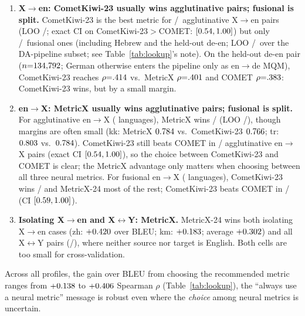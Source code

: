\documentclass[11pt]{article}
\begin{document}
\begin{enumerate}[leftmargin=*,itemsep=4pt,topsep=4pt]
  \item \textbf{X$\to$en: CometKiwi-23 usually wins agglutinative pairs; fusional is split.} CometKiwi-23 is the best metric for \WinXtoEnAgglutin/\WinTotalXtoEnAgglutin\ agglutinative X$\to$en pairs (LOO \LOOXtoEnAgglutin/\LOOTotalXtoEnAgglutin; exact CI on CometKiwi-23$>$COMET: $[0.54, 1.00]$) but only \WinXtoEnFusional/\WinTotalXtoEnFusional\ fusional ones (including Hebrew and the held-out de-en; LOO \LOOXtoEnFusional/\LOOTotalXtoEnFusional\ over the DA-pipeline subset; see Table~\ref{tab:lookup}'s note). On the held-out de-en pair ($n{=}134{,}792$; German otherwise enters the pipeline only as en$\to$de MQM), CometKiwi-23 reaches $\rho{=}.414$ vs.\ MetricX $\rho{=}.401$ and COMET $\rho{=}.383$: CometKiwi-23 wins, but by a small margin.

  \item \textbf{en$\to$X: MetricX usually wins agglutinative pairs; fusional is split.} For agglutinative en$\to$X (\WinTotalEntoXAgglutin{} languages), MetricX wins \WinEntoXAgglutin/\WinTotalEntoXAgglutin{} (LOO \LOOEntoXAgglutin/\LOOTotalEntoXAgglutin), though margins are often small (kk: MetricX $0.784$ vs.\ CometKiwi-23 $0.766$; tr: $0.803$ vs.\ $0.784$). CometKiwi-23 still beats COMET in \BeatsCometEntoXAgglutin/\WinTotalEntoXAgglutin{} agglutinative en$\to$X pairs (exact CI $[0.54, 1.00]$), so the choice between CometKiwi-23 and COMET is clear; the MetricX advantage only matters when choosing between all three neural metrics. For fusional en$\to$X (\WinTotalEntoXFusional{} languages), CometKiwi-23 wins \WinEntoXFusional/\WinTotalEntoXFusional{} and MetricX-24 most of the rest; CometKiwi-23 beats COMET in \BeatsCometEntoXFusional/\WinTotalEntoXFusional{} (CI $[0.59, 1.00]$).

  \item \textbf{Isolating X$\to$en and X$\leftrightarrow$Y: MetricX.} MetricX-24 wins both isolating X$\to$en cases (zh: $+0.420$ over BLEU; km: $+0.183$; average $+0.302$) and all X$\leftrightarrow$Y pairs (\PivotMetricXWins/\PivotN), where neither source nor target is English. Both cells are too small for cross-validation.
\end{enumerate}

Across all profiles, the gain over BLEU from choosing the recommended metric ranges from $+0.138$ to $+0.406$ Spearman $\rho$ (Table~\ref{tab:lookup}), the ``always use a neural metric'' message is robust even where the \emph{choice} among neural metrics is uncertain.
\end{document}
